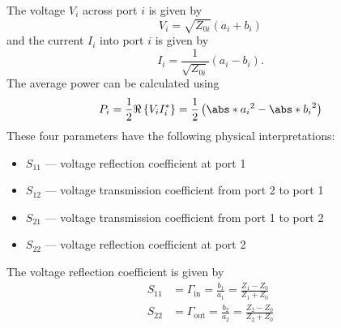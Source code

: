 \documentclass{article}
\begin{document}
The voltage \(V_i\) across port \(i\) is given by
\begin{equation*}
    V_i = \sqrt{Z_{0i}} \left( a_i + b_i \right)
\end{equation*}
and the current \(I_i\) into port \(i\) is given by
\begin{equation*}
    I_i = \frac{1}{\sqrt{Z_{0i}}} \left( a_i - b_i \right).
\end{equation*}
The average power can be calculated using
\begin{equation*}
    P_i = \frac{1}{2} \Re\left\{ V_i I_i^* \right\} = \frac{1}{2} \left( \abs*{a_i}^2 - \abs*{b_i}^2 \right)
\end{equation*}
These four parameters have the following physical interpretations:
\begin{itemize}
    \item \(S_{11}\) --- voltage reflection coefficient at port 1
    \item \(S_{12}\) --- voltage transmission coefficient from port 2 to port 1
    \item \(S_{21}\) --- voltage transmission coefficient from port 1 to port 2
    \item \(S_{22}\) --- voltage reflection coefficient at port 2
\end{itemize}
The voltage reflection coefficient is given by
\begin{align*}
    S_{11} & = \Gamma_{\mathrm{in}} = \frac{b_1}{a_1} = \frac{Z_1 - Z_0}{Z_1 + Z_0}  \\
    S_{22} & = \Gamma_{\mathrm{out}} = \frac{b_2}{a_2} = \frac{Z_2 - Z_0}{Z_2 + Z_0}
\end{align*}
\end{document}
